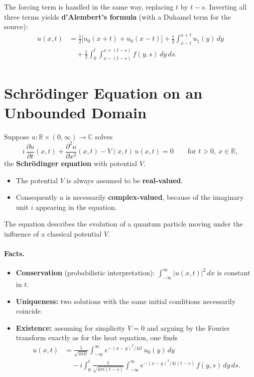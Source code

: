 \smallskip
The forcing term is handled in the same way, replacing $t$ by $t - s$. Inverting all three terms yields \textbf{d'Alembert's formula} (with a Duhamel term for the source):
\[
\boxed{
\begin{aligned}
u(x, t) &= \frac{1}{2}\bigl[u_0(x + t) + u_0(x - t)\bigr]
+ \frac{1}{2}\int_{x - t}^{x + t} u_1(y)\,dy \\
&\quad + \frac{1}{2}\int_0^t\int_{x - (t - s)}^{x + (t - s)} f(y, s)\,dy\,ds.
\end{aligned}}
\]

\section{Schrödinger Equation on an Unbounded Domain}

Suppose $u : \mathbb{R} \times (0, \infty) \to \mathbb{C}$ solves
\[
i\,\frac{\partial u}{\partial t}(x, t) + \frac{\partial^2 u}{\partial x^2}(x, t) - V(x, t)\,u(x, t) = 0
\qquad \text{for } t > 0,\ x \in \mathbb{R},
\]
the \textbf{Schrödinger equation} with potential $V$.
\begin{itemize}
\item The potential $V$ is always assumed to be \textbf{real-valued}.
\item Consequently $u$ is necessarily \textbf{complex-valued}, because of the imaginary unit $i$ appearing in the equation.
\end{itemize}

\begin{remark}
The equation describes the evolution of a quantum particle moving under the influence of a classical potential $V$.
\end{remark}

\paragraph{Facts.}
\begin{itemize}
\item \textbf{Conservation} (probabilistic interpretation): $\displaystyle\int_{-\infty}^{\infty} |u(x, t)|^2\,dx$ is constant in $t$.
\item \textbf{Uniqueness:} two solutions with the same initial conditions necessarily coincide.
\item \textbf{Existence:} assuming for simplicity $V = 0$ and arguing by the Fourier transform exactly as for the heat equation, one finds
\[
\boxed{
\begin{aligned}
u(x, t) &= \frac{1}{\sqrt{4\pi i t}}\int_{-\infty}^{\infty} e^{-(x - y)^2/4it}\,u_0(y)\,dy \\
&\quad - i\int_0^t \frac{1}{\sqrt{4\pi i(t - s)}}\int_{-\infty}^{\infty} e^{-(x - y)^2/4i(t - s)}\,f(y, s)\,dy\,ds.
\end{aligned}}
\]
\end{itemize}

